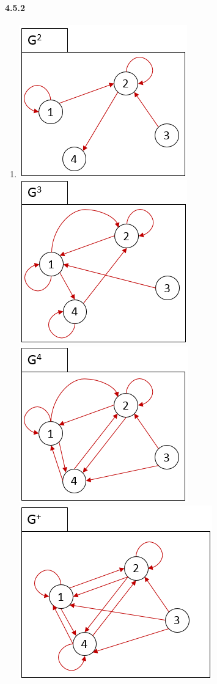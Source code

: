 \documentclass[11pt, letterpaper, twocolumn, fleqn]{article}
\begin{document}
    \paragraph{4.5.2}
        \begin{enumerate}
            \item \includegraphics[scale=.7]{452a1} \newline
                  \includegraphics[scale=.7]{452a2} \newline
                  \includegraphics[scale=.7]{452a3} \newline
                  \includegraphics[scale=.7]{452a4} 

\end{enumerate}
\end{document}
